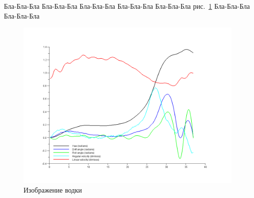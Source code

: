 \documentclass[12pt,a4paper]{report}
\begin{document}
\tableofcontents

Бла-Бла-Бла
Бла-Бла-Бла
Бла-Бла-Бла
Бла-Бла-Бла
Бла-Бла-Бла рис.~\ref{br_base_diagram}
Бла-Бла-Бла
Бла-Бла-Бла

\begin{figure}[ht]
\includegraphics[width=150mm]{br_base_diagram}
\caption{Изображение водки}
\label{br_base_diagram}
\end{figure}

























%
%
%
%
\end{document}
